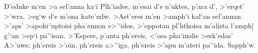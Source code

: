 
\hsize 4in
\obeylines
\agr
D'eduke m`en >a sel'anna
ka`i Plh'iades, m'esai d'e
n'uktes, p'ara d', >'erqet' >'wra,
>eg`w d`e m'ona kate'udw.
\medskip
>Ast'eres m'en >amph`i kal`an sel'annan
>'aps' >apokr'uptoisi pha'ennon e>'`idos,
>'oppotan pl'hthoisa m'alista l'amp{}h|
g'`an >ep`i pa'`isan.
\medskip
>'Espere, p'anta ph'ereis, <'osa pha`inolis >esk'edas' A>'uws;
ph'ereis >'oin,
ph'ereis a>'`iga,
ph'ereis >'apu m'ateri pa'`ida.
\hfill Sapph'w
\bye
